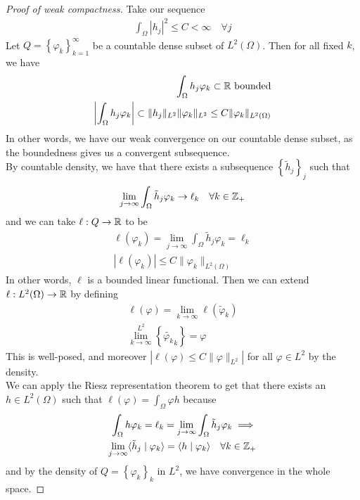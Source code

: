 \documentclass{memoir}
\begin{document}
\begin{proof}[Proof of weak compactness]
	Take our sequence
	\begin{align*}
		\int_\Omega \left| h_j \right|^2 \leq C < \infty \quad \forall j
	\end{align*}
	Let \(Q = \left\{ \varphi_k \right\}_{k=1}^{\infty}\) be a countable dense subset of \(L^2(\Omega )\). Then for all fixed \(k\), we have
	\begin{align*}
		\int_\Omega h_j \varphi_k \subset \mathbb{R} \text{ bounded}\\
		\left| \int_\Omega h_j \varphi_k \right| \subset \|h_j\|_{L^2} \|\varphi_k\|_{L^2} \leq C \|\varphi_k\|_{L^2(\Omega )}
	\end{align*}
	In other words, we have our weak convergence on our countable dense subset, as the boundedness gives us a convergent subsequence.\\

	By countable density, we have that there exists a subsequence \(\left\{ \tilde{h}_j \right\}_j\) such that
	\begin{align*}
		\lim_{j \to \infty} \int_\Omega \tilde{h}_j \varphi_k \to \ell_k\quad \forall k \in \mathbb{Z}_{+}
	\end{align*}
	 and we can take \(\ell:Q\to \mathbb{R}\) to be
	 \begin{align*}
		 \ell(\varphi_k) = \lim_{j \to \infty} \int_\Omega \tilde{h}_j \varphi _k = \ell_k\\
		 \left| \ell(\varphi _k) \right| \leq C \|\varphi_k\|_{L^2(\Omega )}
	 \end{align*}
	 In other words, \(\ell\) is a bounded linear functional. Then we can extend \(\ell:L^2(\Omega )\to \mathbb{R}\) by defining
	 \begin{align*}
		 \ell(\varphi ) = \lim_{k \to \infty} \ell(\tilde{\varphi }_k)\\
		 \lim^{L^2}_{k \to \infty} \left\{ \tilde{\varphi_k }_k \right\} = \varphi 
	 \end{align*}
	 This is well-posed, and moreover \(\left| \ell\left( \varphi  \right) \leq C \|\varphi \|_{L^2} \right| \) for all \(\varphi  \in L^2\) by the density. \\

	 We can apply the Riesz representation theorem to get that there exists an \(h \in L^2(\Omega )\) such that \(\ell(\varphi ) = \int_\Omega \varphi h\) because
	 \begin{align*}
	 	\int_\Omega h \varphi_k = \ell_k = \lim_{j \to \infty} \int_\Omega \tilde{h}_j \varphi_k \implies\\
		\lim_{j \to \infty} \langle \tilde{h}_j \mid \varphi_k \rangle = \langle h \mid \varphi_k \rangle \quad \forall k \in \mathbb{Z}_+
	 \end{align*}
	 and by the density of \(Q = \left\{ \varphi_k \right\}_k\) in \(L^2\), we have convergence in the whole space.
\end{proof}
\end{document}
